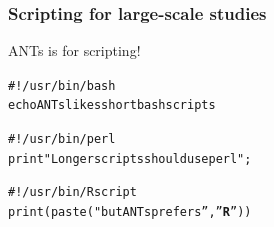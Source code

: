\documentclass[18pt]{beamer}
\begin{document}

\begin{frame}
\frametitle{Scripting for large-scale studies}
\Large ANTs is for scripting!
\begin{alltt} 
 \#! /usr/bin/bash \newline
 echo ANTs likes short bash scripts
\end{alltt}
\begin{alltt} 
\#! /usr/bin/perl \newline
print "Longer scripts should use perl";
\end{alltt}
\begin{alltt} 
\#! /usr/bin/Rscript \newline
print( paste( "but ANTs prefers'',''{\bf R}'' ) )
\end{alltt}
\end{frame}
\end{document}

